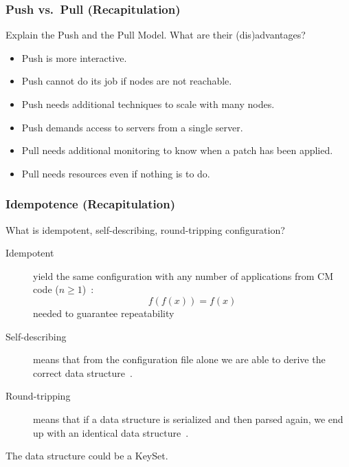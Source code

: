 \begin{frame}
	\frametitle{Push vs.\ Pull (Recapitulation)}

	\begin{task}
	Explain the Push and the Pull Model.
	What are their (dis)advantages?
	\end{task}

	\pause

	\begin{itemize} %
	\item Push is more interactive.
	\item Push cannot do its job if nodes are not reachable.
	\item Push needs additional techniques to scale with many nodes.
	\item Push demands access to servers from a single server.
	\item Pull needs additional monitoring to know when a patch has been applied.
	\item Pull needs resources even if nothing is to do.
	\end{itemize}
\end{frame}


\begin{frame}
	\frametitle{Idempotence (Recapitulation)}

	\begin{task}
	What is idempotent, self-describing, round-tripping configuration?
	\end{task}

	\pause


	\begin{description}
	\item[Idempotent]
	yield the same configuration with any number of applications from CM code ($n\ge1$)~\cite{waldemar2013testing}:
	\[
		f(f(x))=f(x)
	\]
	needed to guarantee repeatability

	\item[Self-describing]
	means that from the configuration file alone we are able to derive the correct data structure~\cite{wadler2003xml}.

	\item[Round-tripping]
	means that if a data structure is serialized and then parsed again, we end up with an identical data structure~\cite{wadler2003xml}.
	\end{description}

	The data structure could be a KeySet.
\end{frame}


